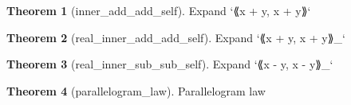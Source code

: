 \documentclass{article}
\theoremstyle{definition}
\newtheorem{theorem}{Theorem}
\begin{document}
\begin{theorem}[inner_add_add_self]
Expand `⟪x + y, x + y⟫`
\end{theorem}

\begin{theorem}[real_inner_add_add_self]
Expand `⟪x + y, x + y⟫_`
\end{theorem}

\begin{theorem}[real_inner_sub_sub_self]
Expand `⟪x - y, x - y⟫_`
\end{theorem}

\begin{theorem}[parallelogram_law]
Parallelogram law
\end{theorem}
\end{document}
